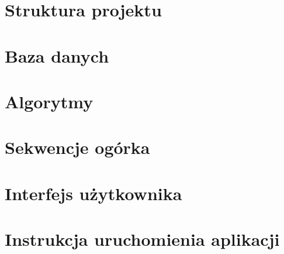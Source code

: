 \section{Struktura projektu}

\section{Baza danych}

\section{Algorytmy}

\section{Sekwencje ogórka}

\section{Interfejs użytkownika}

\section{Instrukcja uruchomienia aplikacji}

